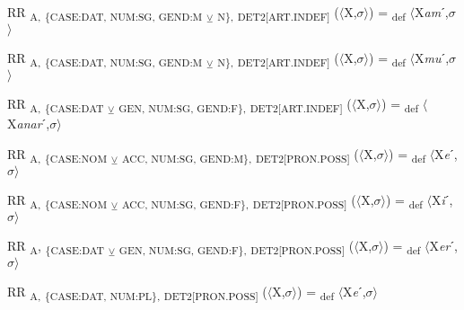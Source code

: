 {\begin{exe}
 RR \textsubscript{A,} \textsubscript{\{CASE:DAT, NUM:SG, GEND:M} \textsubscript{${\veebar}$}\textsubscript{ N\},} \textsubscript{DET2[ART.INDEF]} ($\langle$X,$\sigma $$\rangle$) = \textsubscript{def} $\langle$X\textit{am}ˊ,$\sigma $$\rangle$
\end{exe}

\begin{exe}
 RR \textsubscript{A,} \textsubscript{\{CASE:DAT, NUM:SG, GEND:M} \textsubscript{${\veebar}$}\textsubscript{ N\},} \textsubscript{DET2[ART.INDEF]} ($\langle$X,$\sigma $$\rangle$) = \textsubscript{def} $\langle$X\textit{mu}ˊ,$\sigma $$\rangle$
\end{exe}

\begin{exe}
 RR \textsubscript{A,} \textsubscript{\{CASE:DAT} \textsubscript{${\veebar}$}\textsubscript{ GEN, NUM:SG, GEND:F\},} \textsubscript{DET2[ART.INDEF]} ($\langle$X,$\sigma $$\rangle$) = \textsubscript{def} $\langle$X\textit{anar}ˊ,$\sigma $$\rangle$
\end{exe}

\begin{exe}
 RR \textsubscript{A,} \textsubscript{\{CASE:NOM} \textsubscript{${\veebar}$}\textsubscript{ ACC, NUM:SG, GEND:M\},} \textsubscript{DET2[PRON.POSS]} ($\langle$X,$\sigma $$\rangle$) = \textsubscript{def} $\langle$X\textit{e}ˊ,$\sigma $$\rangle$
\end{exe}

\begin{exe}
 RR \textsubscript{A,} \textsubscript{\{CASE:NOM} \textsubscript{${\veebar}$}\textsubscript{ ACC, NUM:SG, GEND:F\},} \textsubscript{DET2[PRON.POSS]} ($\langle$X,$\sigma $$\rangle$) = \textsubscript{def} $\langle$X\textit{i}ˊ,$\sigma $$\rangle$
\end{exe}

\begin{exe}
 RR \textsubscript{A}, \textsubscript{\{CASE:DAT} \textsubscript{${\veebar}$}\textsubscript{ GEN, NUM:SG, GEND:F\},} \textsubscript{DET2[PRON.POSS]} ($\langle$X,$\sigma $$\rangle$) = \textsubscript{def} $\langle$X\textit{er}ˊ,$\sigma $$\rangle$
\end{exe}

\begin{exe}
 RR \textsubscript{A,} \textsubscript{\{CASE:DAT, NUM:PL\},} \textsubscript{DET2[PRON.POSS]} ($\langle$X,$\sigma $$\rangle$) = \textsubscript{def} $\langle$X\textit{e}ˊ,$\sigma $$\rangle$
\end{exe}

}
